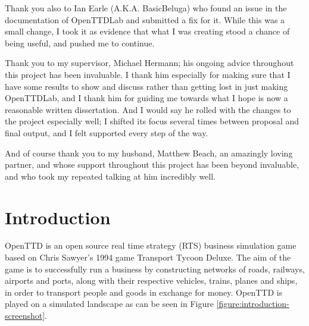 \documentclass[logo,msc,dsti]{style/infthesis}    %
\begin{document}
\begin{preliminary}
\begin{acknowledgements}
Thank you also to Ian Earle (A.K.A. BasicBeluga) who found an issue in the documentation of OpenTTDLab and submitted a fix for it. While this was a small change, I took it as evidence that what I was creating stood a chance of being useful, and pushed me to continue.

Thank you to my supervisor, Michael Hermann; his ongoing advice throughout this project has been invaluable. I thank him especially for making sure that I have some results to show and discuss rather than getting lost in just making OpenTTDLab, and I thank him for guiding me towards what I hope is now a reasonable written dissertation. And I would say he rolled with the changes to the project especially well; I shifted its focus several times between proposal and final output, and I felt supported every step of the way.

And of course thank you to my husband, Matthew Beach, an amazingly loving partner, and whose support throughout this project has been beyond invaluable, and who took my repeated talking at him incredibly well.

\end{acknowledgements}

\tableofcontents

\end{preliminary}


\chapter{Introduction}
\label{chapter:introduction}

OpenTTD \cite{openttd} is an open source real time strategy (RTS) business simulation game based on  Chris Sawyer's 1994 game Transport Tycoon Deluxe. The aim of the game is to successfully run a business by constructing networks of roads, railways, airports and ports, along with their respective vehicles, trains, planes and ships, in order to transport people and goods in exchange for money. OpenTTD is played on a simulated landscape as can be seen in Figure \ref{figure:introduction-screenshot}.
\end{document}
